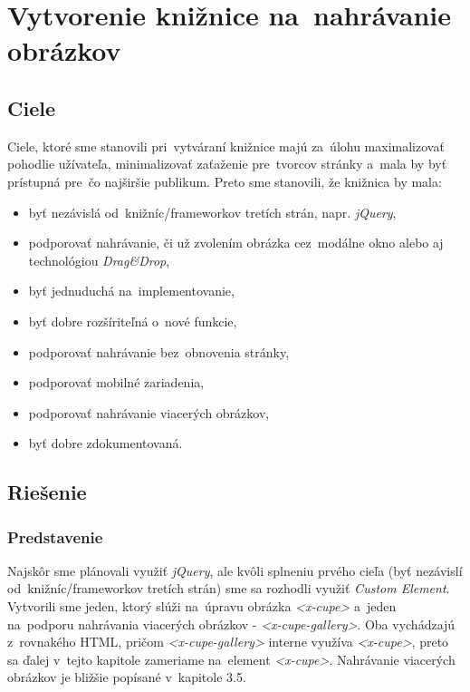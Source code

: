 \chapter{Vytvorenie knižnice na~nahrávanie obrázkov}
\label{sec:solution}

\section{Ciele}
\label{sec:goals}

Ciele, ktoré sme stanovili pri~vytváraní knižnice majú za~úlohu maximalizovať pohodlie užívateľa, minimalizovať zaťaženie pre~tvorcov stránky a~mala by byť prístupná pre~čo najširšie publikum. Preto sme stanovili, že knižnica by mala:

\begin{itemize}
	\item byť nezávislá od~knižníc/frameworkov tretích strán, napr. \emph{jQuery},
	\item podporovať nahrávanie, či už zvolením obrázka cez~modálne okno alebo aj technológiou \emph{Drag\&Drop}, 
	\item byť jednuduchá na~implementovanie,
	\item byť dobre rozšíriteľná o~nové funkcie,
	\item podporovať nahrávanie bez~obnovenia stránky,
	\item podporovať mobilné zariadenia,
	\item podporovať nahrávanie viacerých obrázkov,
	\item byť dobre zdokumentovaná.
\end{itemize}


\section{Riešenie}
\subsection{Predstavenie}
\label{sec:predstavenie-riesenia}
Najskôr sme plánovali využiť \emph{jQuery}, ale kvôli splneniu prvého cieľa (byť nezávislí od~knižníc/frameworkov tretích strán) sme sa rozhodli využiť \emph{Custom Element}. Vytvorili sme jeden, ktorý slúži na~úpravu obrázka \emph{<x-cupe>} a~jeden na~podporu nahrávania viacerých obrázkov - \emph{<x-cupe-gallery>}. Oba vychádzajú z~rovnakého HTML, pričom \emph{<x-cupe-gallery>} interne využíva \emph{<x-cupe>}, preto sa ďalej v~tejto kapitole zameriame na~element \emph{<x-cupe>}. Nahrávanie viacerých obrázkov je bližšie popísané v~kapitole 3.5.



